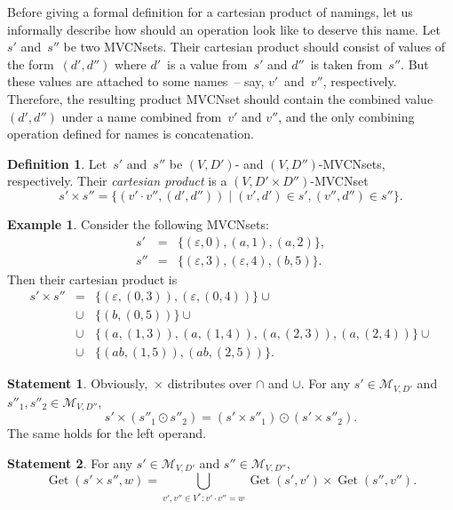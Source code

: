 \documentclass{article}
\theoremstyle{definition}
\newtheorem{Df}{Definition}
\newtheorem{St}{Statement}
\newtheorem{Ex}{Example}
\newcommand{\setcharmvcn}{M}
\newcommand{\setsymbol}[3]{\mathcal{#1}_{#2,#3}}
\newcommand{\setmvcn}[2]{\setsymbol{\setcharmvcn}{#1}{#2}}
\newcommand{\deref}{\operatorname{Get}}
\begin{document}
Before giving a formal definition for a cartesian product of namings, let us
informally describe how should an operation look like to deserve this name.
Let~$s'$ and~$s''$ be two MVCNsets. Their cartesian product should consist of
values of the form~$(d',d'')$ where $d'$~is a value from~$s'$ and $d''$~is taken
from~$s''$. But these values are attached to some names~-- say, $v'$~and~$v''$,
respectively.  Therefore, the resulting product MVCNset should contain the
combined value~$(d',d'')$ under a name combined from~$v'$ and $v''$, and the only
combining operation defined for names is concatenation.

\begin{Df}\label{df:mvcn-cartesian}
Let~$s'$ and~$s''$ be $(V,D')$- and $(V,D'')$-MVCNsets, respectively. Their
\emph{cartesian product} is a $(V,D'\times D'')$-MVCNset
\[
  s'\times s'' = \{ (v'\cdot v'', (d',d'')) \mid (v',d')\in s', (v'',d'')\in s'' \} .
\]
\end{Df}

\begin{Ex}\label{ex:cartesian}
Consider the following MVCNsets:
\begin{eqnarray*}
  s'  & = & \{ (\varepsilon, 0), (a, 1), (a, 2) \} , \\
  s'' & = & \{ (\varepsilon, 3), (\varepsilon, 4), (b, 5) \} .
\end{eqnarray*}
Then their cartesian product is
\begin{eqnarray*}
  s' \times s'' & = &  \{ (\varepsilon, (0, 3)), (\varepsilon, (0, 4)) \} \cup \\
    & \cup & \{ (b, (0, 5)) \} \cup \\
    & \cup & \{ (a, (1, 3)), (a, (1, 4)), (a, (2, 3)), (a, (2, 4)) \} \cup \\
    & \cup & \{ (ab, (1, 5)), (ab, (2, 5)) \} .
\end{eqnarray*}
\end{Ex}

\begin{St}\label{st:cartesian-distributivity}
Obviously,~$\times$ distributes over $\cap$ and $\cup$.
For any $s' \in \setmvcn{V}{D'}$ and $s''_1, s''_2 \in \setmvcn{V}{D''}$,
\[
  s'\times(s''_1\odot s''_2) = (s'\times s''_1) \odot (s'\times s''_2) .
\]
The same holds for the left operand.
\end{St}

\begin{St}\label{st:deref-cartesian}
For any $s' \in \setmvcn{V}{D'}$ and $s'' \in \setmvcn{V}{D''}$,
\[
  \deref(s' \times s'', w) =
      \bigcup_{v',v''\in V^\ast: v'\cdot v'' = w}
          \deref(s', v')
          \times
          \deref(s'', v'') .
\]
\end{St}
\end{document}
